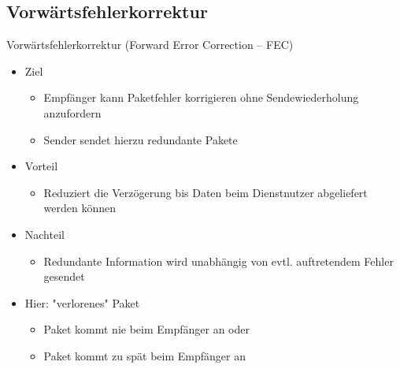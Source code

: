   \subsection{Vorwärtsfehlerkorrektur}
    Vorwärtsfehlerkorrektur (Forward Error Correction -- FEC)
    \begin{itemize}
      \item Ziel
        \begin{itemize}
          \item Empfänger kann Paketfehler korrigieren ohne Sendewiederholung anzufordern
          \item Sender sendet hierzu redundante Pakete
        \end{itemize}
      \item Vorteil
        \begin{itemize}
          \item Reduziert die Verzögerung bis Daten beim Dienstnutzer abgeliefert werden können
        \end{itemize}
      \item Nachteil
        \begin{itemize}
          \item Redundante Information wird unabhängig von evtl. auftretendem Fehler gesendet
        \end{itemize}
      \item Hier: "verlorenes" Paket
        \begin{itemize}
          \item Paket kommt nie beim Empfänger an oder
          \item Paket kommt zu spät beim Empfänger an
        \end{itemize}
    \end{itemize}
